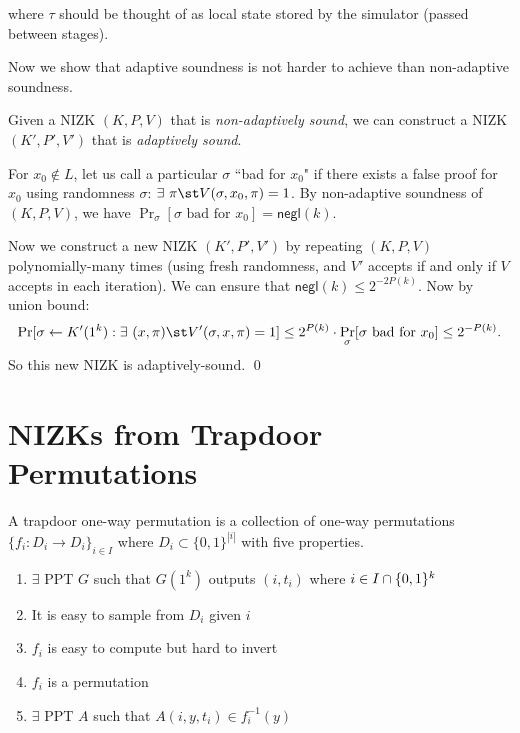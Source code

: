 \medskip
\noindent where $\tau$ should be thought of as local state stored by the simulator (passed
    between stages).

\bigskip
Now we show that adaptive soundness is not harder to achieve than non-adaptive soundness.
\begin{theorem}\label{thm:amplify-soundness}
    Given a NIZK $(K, P, V)$ that is \emph{non-adaptively sound}, we can
    construct a NIZK $(K', P', V')$ that is \emph{adaptively sound}.
\end{theorem}
\proof
For $x_0 \not\in L$, let us call a particular $\sigma$ ``bad for $x_0$" if 
there exists a false proof for $x_0$ using randomness $\sigma$:
$\exists~ \pi \st V(\sigma, x_0, \pi) = 1$.
By non-adaptive soundness of $(K, P, V)$, we have
$\Pr_\sigma[\sigma \text{ bad for } x_0] = \mathsf{negl}(k)$.

Now we construct a new NIZK $(K',P',V')$ by repeating $(K,P,V)$ polynomially-many times
(using fresh randomness, and $V'$ accepts if and only if $V$ accepts in each iteration).
We can ensure that $\mathsf{negl}(k) \leq 2^{-2P(k)}$.
Now by union bound:
$$
\Pr[\sigma \gets K'(1^k): \exists~ (x, \pi) \st V'(\sigma, x, \pi) = 1] \leq
2^{P(k)}\cdot \Pr_\sigma[\sigma \text{ bad for } x_0] \leq 2^{-P(k)}.$$
So this new NIZK is adaptively-sound. \qed


\section{NIZKs from Trapdoor Permutations}

\begin{definition}
A trapdoor one-way permutation is a collection of one-way permutations $\{f_i : D_i \rightarrow D_i\}_{i \in I}$ where $D_i \subset \{0,1\}^{|i|}$ with
five properties.

\begin{enumerate}
\item $\exists$ PPT $G$ such that $G(1^k)$ outputs $(i,t_i)$ where $i \in I\cap \{0,1\}^{k}$
\item It is easy to sample from $D_i$ given $i$ 
\item $f_i$ is easy to compute but hard to invert
\item  $f_i$ is a permutation
\item $\exists$ PPT $A$ such that $A(i, y, t_i)\in f_i^{-1}(y)$
\end{enumerate}
\end{definition}

